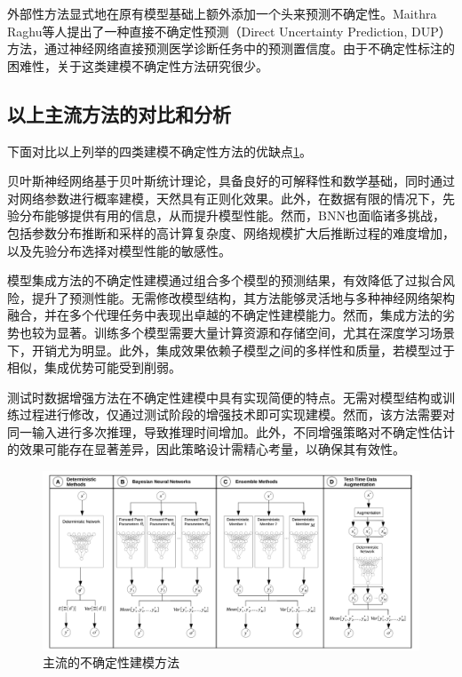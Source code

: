 外部性方法显式地在原有模型基础上额外添加一个头来预测不确定性。Maithra Raghu等人\cite{raghu2019direct}提出了一种直接不确定性预测（Direct Uncertainty Prediction, DUP）方法，通过神经网络直接预测医学诊断任务中的预测置信度。由于不确定性标注的困难性，关于这类建模不确定性方法研究很少。




\subsection{以上主流方法的对比和分析}
下面对比以上列举的四类建模不确定性方法的优缺点\ref{fig:uq}。

贝叶斯神经网络基于贝叶斯统计理论，具备良好的可解释性和数学基础，同时通过对网络参数进行概率建模，天然具有正则化效果。此外，在数据有限的情况下，先验分布能够提供有用的信息，从而提升模型性能。然而，BNN也面临诸多挑战，包括参数分布推断和采样的高计算复杂度、网络规模扩大后推断过程的难度增加，以及先验分布选择对模型性能的敏感性。

模型集成方法的不确定性建模通过组合多个模型的预测结果，有效降低了过拟合风险，提升了预测性能。无需修改模型结构，其方法能够灵活地与多种神经网络架构融合，并在多个代理任务中表现出卓越的不确定性建模能力。然而，集成方法的劣势也较为显著。训练多个模型需要大量计算资源和存储空间，尤其在深度学习场景下，开销尤为明显。此外，集成效果依赖子模型之间的多样性和质量，若模型过于相似，集成优势可能受到削弱。  

测试时数据增强方法在不确定性建模中具有实现简便的特点。无需对模型结构或训练过程进行修改，仅通过测试阶段的增强技术即可实现建模。然而，该方法需要对同一输入进行多次推理，导致推理时间增加。此外，不同增强策略对不确定性估计的效果可能存在显著差异，因此策略设计需精心考量，以确保其有效性。  

\begin{figure}[H]
    \centering
    \includegraphics[width=0.9\linewidth]{assets/uq.png}
    \caption{主流的不确定性建模方法\cite{gawlikowski2023survey}
}
    \label{fig:uq}
\end{figure}


